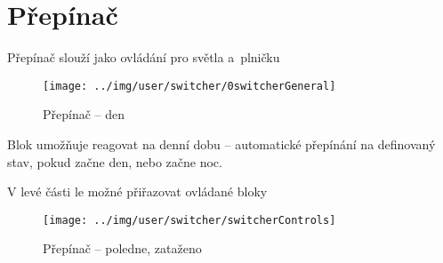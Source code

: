 
\section{Přepínač}

Přepínač slouží jako ovládání pro světla a~plničku

\begin{figure}[!ht]\centering
\texttt{[image: ../img/user/switcher/0switcherGeneral]}

\caption{Přepínač -- den}
\label{fig:user_switcher_0switcherGeneral}

\end{figure}

\FloatBarrier

Blok umožňuje reagovat na denní dobu -- automatické přepínání na definovaný stav, pokud začne den, nebo začne noc.

V levé části le možné přiřazovat ovládané bloky

\begin{figure}[!ht]\centering
\texttt{[image: ../img/user/switcher/switcherControls]}

\caption{Přepínač -- poledne, zataženo}
\label{fig:user_switcher_switcherControls}

\end{figure}


\FloatBarrier